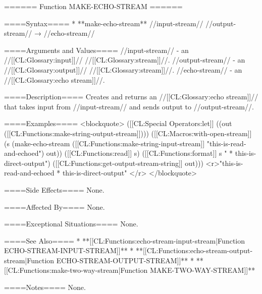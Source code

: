 ====== Function MAKE-ECHO-STREAM ======

====Syntax====
  * **make-echo-stream** //input-stream// //output-stream// → //echo-stream//

====Arguments and Values====
//input-stream// - an //[[CL:Glossary:input]]// //[[CL:Glossary:stream]]//.
//output-stream// - an //[[CL:Glossary:output]]// //[[CL:Glossary:stream]]//.
//echo-stream// - an //[[CL:Glossary:echo stream]]//.

====Description====
Creates and returns an //[[CL:Glossary:echo stream]]// that takes input from //input-stream// and sends output to //output-stream//.

====Examples==== 
<blockquote> 
([[CL:Special Operators:let]] ((out ([[CL:Functions:make-string-output-stream]]))) 
  ([[CL:Macros:with-open-stream]] (s (make-echo-stream 
                         ([[CL:Functions:make-string-input-stream]] "this-is-read-and-echoed")
                         out))
    ([[CL:Functions:read]] s)
    ([[CL:Functions:format]] s " * this-is-direct-output") 
    ([[CL:Functions:get-output-stream-string]] out))) 
<r>"this-is-read-and-echoed * this-is-direct-output" </r>
</blockquote>

====Side Effects====
None.

====Affected By====
None.

====Exceptional Situations====
None.

====See Also====
  * **[[CL:Functions:echo-stream-input-stream|Function ECHO-STREAM-INPUT-STREAM]]**
  * **[[CL:Functions:echo-stream-output-stream|Function ECHO-STREAM-OUTPUT-STREAM]]**
  * **[[CL:Functions:make-two-way-stream|Function MAKE-TWO-WAY-STREAM]]**

====Notes====
None.

